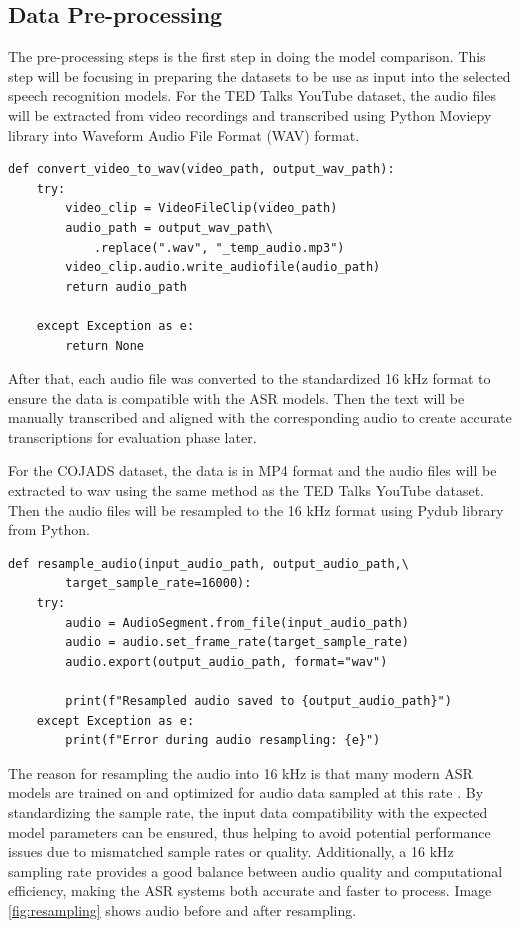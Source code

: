 \subsection{Data Pre-processing}
The pre-processing steps is the first step in doing the model comparison. This step will be focusing in preparing the datasets to be use as input into the selected speech recognition models. For the TED Talks YouTube dataset, the audio files will be extracted from video recordings and transcribed using Python Moviepy library into Waveform Audio File Format (WAV) format.
\begin{lstlisting}[caption={Python code to convert video to WAV format using moviepy}]
    def convert_video_to_wav(video_path, output_wav_path):
    try:
        video_clip = VideoFileClip(video_path)
        audio_path = output_wav_path\
            .replace(".wav", "_temp_audio.mp3")
        video_clip.audio.write_audiofile(audio_path)
        return audio_path
    
    except Exception as e:
        return None
\end{lstlisting}
After that, each audio file was converted to the standardized 16 kHz format to ensure the data is compatible with the ASR models. Then the text will be manually transcribed and aligned with the corresponding audio to create accurate transcriptions for evaluation phase later.

For the COJADS dataset, the data is in MP4 format and the audio files will be extracted to wav using the same method as the TED Talks YouTube dataset. Then the audio files will be resampled to the 16 kHz format using Pydub library from Python.

\begin{lstlisting}[caption={Python code to resample audio to 16 kHz using pydub}]
    def resample_audio(input_audio_path, output_audio_path,\
        target_sample_rate=16000):
    try:
        audio = AudioSegment.from_file(input_audio_path)
        audio = audio.set_frame_rate(target_sample_rate)
        audio.export(output_audio_path, format="wav")
        
        print(f"Resampled audio saved to {output_audio_path}")
    except Exception as e:
        print(f"Error during audio resampling: {e}")
\end{lstlisting}
The reason for resampling the audio into 16 kHz is that many modern ASR models are trained on and optimized for audio data sampled at this rate \parencite{Gergen}. By standardizing the sample rate, the input data compatibility with the expected model parameters can be ensured, thus helping to avoid potential performance issues due to mismatched sample rates or quality. Additionally, a 16 kHz sampling rate provides a good balance between audio quality and computational efficiency, making the ASR systems both accurate and faster to process. Image \ref{fig:resampling} shows audio before and after resampling.

